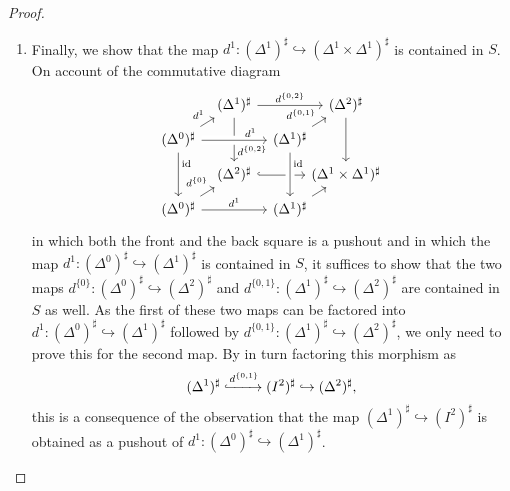 \documentclass[reqno]{amsart}
\numberwithin{equation}{subsection}
\theoremstyle{plain}
\theoremstyle{definition}
\let\into=\hookrightarrow
\DeclareMathOperator{\id}{id}
\begin{document}
\begin{proof}
\begin{enumerate}
		\item Finally, we show that the map $d^1\colon(\Delta^1)^\sharp\into(\Delta^1\times\Delta^1)^\sharp$ is contained in $S$. On account of the commutative diagram
		\begin{equation*}
		\begin{tikzcd}[column sep={4em,between origins}, row sep={2.5em,between origins}]
		& (\Delta^1)^\sharp\arrow[rr, "d^{\{0,2\}}"]\arrow[dd, "d^{\{0,2\}}", near end] && (\Delta^2)^\sharp\arrow[dd]\\
		(\Delta^0)^\sharp\arrow[dd, "\id",near start]\arrow[rr, "d^1", crossing over, near end] \arrow[ur, "d^1"]&& (\Delta^1)^\sharp\arrow[ur, "d^{\{0,1\}}"] & \\
		& (\Delta^2)^\sharp\arrow[rr, hookrightarrow] && (\Delta^1\times\Delta^1)^\sharp\\
		(\Delta^0)^\sharp\arrow[rr, "d^1"] \arrow[ur, "d^{\{0\}}", near end]&& (\Delta^1)^\sharp\arrow[from=uu, "\id", crossing over, near start]\arrow[ur] &
		\end{tikzcd}
		\end{equation*}
		in which both the front and the back square is a pushout and in which the map $d^1\colon (\Delta^0)^\sharp\into(\Delta^1)^\sharp$ is contained in $S$, it suffices to show that the two maps $d^{\{0\}}\colon (\Delta^0)^\sharp\into(\Delta^2)^\sharp$ and $d^{\{0,1\}}\colon(\Delta^1)^\sharp\into(\Delta^2)^\sharp$ are contained in $S$ as well.
		As the first of these two maps can be factored into $d^1\colon (\Delta^0)^\sharp\into(\Delta^1)^\sharp$ followed by $d^{\{0,1\}}\colon (\Delta^1)^\sharp\into(\Delta^2)^\sharp$, we only need to prove this for the second map. By in turn factoring this morphism as
		\begin{equation*}
		(\Delta^1)^\sharp\xhookrightarrow{d^{\{0,1\}}} (I^2)^\sharp\into (\Delta^2)^\sharp, 
		\end{equation*}
		this is a consequence of the observation that the map $(\Delta^1)^\sharp\into(I^2)^\sharp$ is obtained as a pushout of $d^1\colon(\Delta^0)^\sharp\into(\Delta^1)^\sharp$.\qedhere
	\end{enumerate}
\end{proof}
\end{document}

